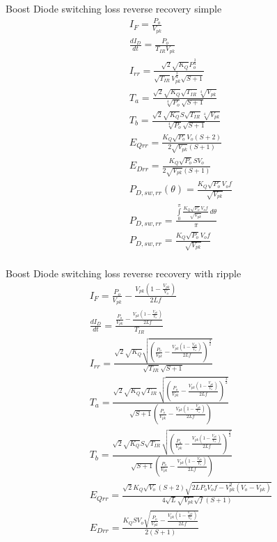 \documentclass[12pt]{report}
\begin{document}
Boost Diode switching loss reverse recovery simple
\begin{align}
I_{F} = \frac{P_{o}}{V_{pk}}\\
\frac{dI_{D}}{dt} = \frac{P_{o}}{T_{IR} V_{pk}}\\
I_{rr} = \frac{\sqrt{2} \sqrt{K_{Q}} P_{o}^{\frac{3}{4}}}{\sqrt{T_{IR}} V_{pk}^{\frac{3}{4}} \sqrt{S + 1}}\\
T_{a} = \frac{\sqrt{2} \sqrt{K_{Q}} \sqrt{T_{IR}} \sqrt[4]{V_{pk}}}{\sqrt[4]{P_{o}} \sqrt{S + 1}}\\
T_{b} = \frac{\sqrt{2} \sqrt{K_{Q}} S \sqrt{T_{IR}} \sqrt[4]{V_{pk}}}{\sqrt[4]{P_{o}} \sqrt{S + 1}}\\
E_{Qrr} = \frac{K_{Q} \sqrt{P_{o}} V_{o} \left(S + 2\right)}{2 \sqrt{V_{pk}} \left(S + 1\right)}\\
E_{Drr} = \frac{K_{Q} \sqrt{P_{o}} S V_{o}}{2 \sqrt{V_{pk}} \left(S + 1\right)}\\
P_{D,sw,rr}(\theta) = \frac{K_{Q} \sqrt{P_{o}} V_{o} f}{\sqrt{V_{pk}}}\\
P_{D,sw,rr} = \frac{\int\limits_{0}^{\pi} \frac{K_{Q} \sqrt{P_{o}} V_{o} f}{\sqrt{V_{pk}}}\, d\theta}{\pi}\\
P_{D,sw,rr} = \frac{K_{Q} \sqrt{P_{o}} V_{o} f}{\sqrt{V_{pk}}}\\
\end{align}

Boost Diode switching loss reverse recovery with ripple
\begin{align}
I_{F} = \frac{P_{o}}{V_{pk}} - \frac{V_{pk} \left(1 - \frac{V_{pk}}{V_{o}}\right)}{2 L f}\\
\frac{dI_{D}}{dt} = \frac{\frac{P_{o}}{V_{pk}} - \frac{V_{pk} \left(1 - \frac{V_{pk}}{V_{o}}\right)}{2 L f}}{T_{IR}}\\
I_{rr} = \frac{\sqrt{2} \sqrt{K_{Q}} \sqrt{\left(\frac{P_{o}}{V_{pk}} - \frac{V_{pk} \left(1 - \frac{V_{pk}}{V_{o}}\right)}{2 L f}\right)^{\frac{3}{2}}}}{\sqrt{T_{IR}} \sqrt{S + 1}}\\
T_{a} = \frac{\sqrt{2} \sqrt{K_{Q}} \sqrt{T_{IR}} \sqrt{\left(\frac{P_{o}}{V_{pk}} - \frac{V_{pk} \left(1 - \frac{V_{pk}}{V_{o}}\right)}{2 L f}\right)^{\frac{3}{2}}}}{\sqrt{S + 1} \left(\frac{P_{o}}{V_{pk}} - \frac{V_{pk} \left(1 - \frac{V_{pk}}{V_{o}}\right)}{2 L f}\right)}\\
T_{b} = \frac{\sqrt{2} \sqrt{K_{Q}} S \sqrt{T_{IR}} \sqrt{\left(\frac{P_{o}}{V_{pk}} - \frac{V_{pk} \left(1 - \frac{V_{pk}}{V_{o}}\right)}{2 L f}\right)^{\frac{3}{2}}}}{\sqrt{S + 1} \left(\frac{P_{o}}{V_{pk}} - \frac{V_{pk} \left(1 - \frac{V_{pk}}{V_{o}}\right)}{2 L f}\right)}\\
E_{Qrr} = \frac{\sqrt{2} K_{Q} \sqrt{V_{o}} \left(S + 2\right) \sqrt{2 L P_{o} V_{o} f - V_{pk}^{2} \left(V_{o} - V_{pk}\right)}}{4 \sqrt{L} \sqrt{V_{pk}} \sqrt{f} \left(S + 1\right)}\\
E_{Drr} = \frac{K_{Q} S V_{o} \sqrt{\frac{P_{o}}{V_{pk}} - \frac{V_{pk} \left(1 - \frac{V_{pk}}{V_{o}}\right)}{2 L f}}}{2 \left(S + 1\right)}\\
\end{align}
\end{document}
